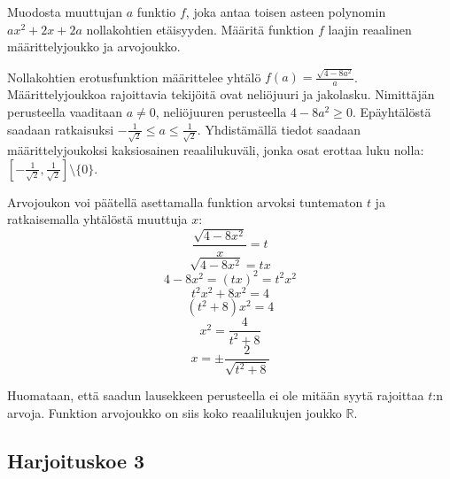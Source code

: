\begin{tehtava}
	\begin{alakohdat}
	\end{alakohdat}
	\begin{vastaus}
		\begin{alakohdat}
	\end{alakohdat}
	\end{vastaus}
\end{tehtava}

\begin{tehtava}
Muodosta muuttujan $a$ funktio $f$, joka antaa toisen asteen polynomin $ax^2+2x+2a$ nollakohtien etäisyyden. Määritä funktion $f$ laajin reaalinen määrittelyjoukko ja arvojoukko.
	\begin{vastaus}
	Nollakohtien erotusfunktion määrittelee yhtälö $f(a)=\frac{\sqrt{4-8a^2}}{a}$. Määrittelyjoukkoa rajoittavia tekijöitä ovat neliöjuuri ja jakolasku. Nimittäjän perusteella vaaditaan $a\neq 0$, neliöjuuren perusteella $4-8a^2\geq 0$. Epäyhtälöstä saadaan ratkaisuksi $-\frac{1}{\sqrt{2}}\leq a \leq \frac{1}{\sqrt{2}}$. Yhdistämällä tiedot saadaan määrittelyjoukoksi kaksiosainen reaalilukuväli, jonka osat erottaa luku nolla: $[-\frac{1}{\sqrt{2}},\frac{1}{\sqrt{2}}] \setminus \lbrace 0 \rbrace$. %
	
Arvojoukon voi päätellä asettamalla funktion arvoksi tuntematon $t$ ja ratkaisemalla yhtälöstä muuttuja $x$:
	$$\frac{\sqrt{4-8x^2}}{x}=t$$
	$$\sqrt{4-8x^2}=tx$$
	$$4-8x^2=(tx)^2=t^2x^2$$
	$$t^2x^2+8x^2=4$$
	$$(t^2+8)x^2=4$$
	$$x^2=\frac{4}{t^2+8}$$
	$$x=\pm \frac{2}{\sqrt{t^2+8}}$$
	
	Huomataan, että saadun lausekkeen perusteella ei ole mitään syytä rajoittaa $t$:n arvoja. Funktion arvojoukko on siis koko reaalilukujen joukko $\mathbb{R}$.
	\end{vastaus}
\end{tehtava}

\subsection*{Harjoituskoe 3}

